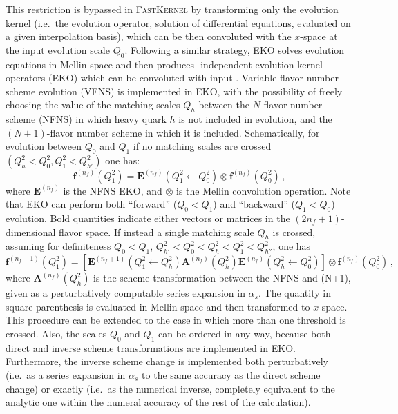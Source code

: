 This restriction is bypassed in \textsc{\small FastKernel} by transforming only the
evolution kernel (i.e.\ the evolution operator, solution of differential
equations, evaluated on a given interpolation basis), which can be then
convoluted with the $x$-space \pdfs at the input evolution scale $Q_0$.
Following a similar strategy, \textsc{\small EKO}
solves evolution equations in Mellin space and then produces \pdf-independent
evolution kernel operators (EKO) which can be convoluted with input 
\pdfs.
%
Variable flavor number scheme evolution (VFNS) is implemented in \textsc{\small EKO}, with
the possibility of freely choosing the value of the matching scales
$Q_{h}$ between the $N$-flavor number scheme (NFNS) in which heavy quark $h$
is not included in \qcd evolution, and the $(N+1)$-flavor number
scheme in which it is included.
%
Schematically, for evolution between $Q_0$ and $Q_1$ if no matching
scales are crossed $\left(Q_{h}^2 < Q_0^2 , Q_1^2 < Q_{h'}^2\right)$ one has:
\begin{equation}
\label{eq:ic/EKO1}
{\mathbf{f}}^{(n_f)}(Q^2_1)= {\mathbf{E}}^{(n_f)}(Q^2_1\leftarrow Q^2_0) \otimes {\mathbf{f}}^{(n_f)}(Q^2_0) \, ,
\end{equation}
where
${\mathbf{E}}^{(n_f)}$ is the  NFNS \textsc{\small EKO},
and $\otimes$ is the Mellin convolution operation. Note that \textsc{\small EKO}
can perform both ``forward'' ($Q_0< Q_1$)  and ``backward'' ($Q_1< Q_0$)
evolution.
%
Bold quantities indicate either vectors or matrices
in the $(2n_f+1)$-dimensional flavor space.
If instead a single matching scale $Q_h$ is crossed, assuming for definiteness $Q_0< Q_1$,  
$Q_{h'}^2 < Q_0^2 < Q_{h}^2 < Q_1^2 < Q_{h''}^2$,
one has
\begin{equation}
\label{eq:ic/EKO2}
{\mathbf{f}}^{(n_f+1)}(Q^2_1)= \left[ {\mathbf{E}}^{(n_f+1)}(Q^2_1\leftarrow Q_{h}^2)  
{\mathbf{A}}^{(n_f)}(Q_{h}^2) {\mathbf{E}}^{(n_f)}(Q_{h}^2\leftarrow Q^2_0) \right] \otimes {\mathbf{f}}^{(n_f)}(Q^2_0) \, ,
\end{equation}
where $\mathbf{A}^{(n_f)}(Q_{h}^2)$ is the scheme transformation
between the NFNS and (N+1)\fns, given as a perturbatively computable
series expansion in $\alpha_s$. 
%
The quantity in square parenthesis is evaluated in Mellin space and then transformed to $x$-space.
%
This procedure can be  extended to the case in which  more than
one threshold is crossed.
%
Also, the scales $Q_0$ and $Q_1$ can be ordered in any way, because both direct
and inverse scheme transformations are implemented in
\textsc{\small EKO}. Furthermore, the inverse scheme change  is implemented both
perturbatively (i.e.\ as a series expansion in $\alpha_s$ to the same
accuracy as the direct scheme change) or exactly (i.e.\ as the numerical
inverse, completely equivalent to the analytic one within the numeral accuracy
of the rest of the calculation).


